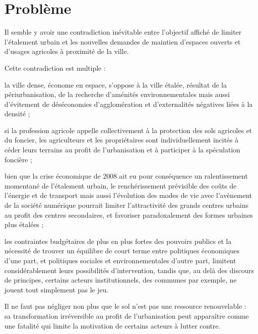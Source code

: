 \section[probleme]{Problème}

Il semble y avoir une contradiction inévitable entre l'objectif affiché de limiter
l'étalement urbain et les nouvelles demandes de maintien d'espaces ouverts
et d'usages agricoles à proximité de la ville.

Cette contradiction est multiple :

\startitemize[a]

\item la ville dense, économe en espace, s'oppose à la ville étalée,
	résultat de la périurbanisation, de la recherche d'aménités environnementales
	mais aussi d'évitement de déséconomies d'agglomération et d'externalités négatives
	liées à la densité ;

\item si la profession agricole appelle collectivement à la protection des sols agricoles
	et du foncier, les agriculteurs et les propriétaires sont individuellement
	incités à céder leurs terrains au profit de l'urbanisation et
	à participer à la spéculation foncière ;

\item bien que la crise économique de 2008 ait eu pour conséquence
	un ralentissement momentané de l'étalement urbain,
	le renchérissement prévisible des coûts de l'énergie et de transport
	mais aussi l'évolution des modes de vie avec l'avènement de la société numérique
	pourrait limiter l'attractivité des grands centres urbains
	au profit des centres secondaires, et favoriser paradoxalement des formes urbaines
	plus étalées ;

\item les contraintes budgétaires de plus en plus fortes des pouvoirs publics
	et la nécessité de trouver un équilibre de court terme entre politiques économiques d'une part,
	et politiques sociales et environnementales d'autre part, limitent considérablement
	leurs possibilités d'intervention, tandis que, au delà des discours de principes,
	certains acteurs institutionnels, des communes par exemple,
	ne jouent tout simplement pas le jeu.

\stopitemize

Il ne faut pas négliger non plus que le sol n'est pas une ressource renouvelable :
sa transformation irréversible au profit de l'urbanisation peut apparaître comme une
fatalité qui limite la motivation de certains acteurs à lutter contre.

